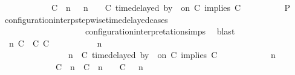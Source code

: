 \begin{isabellebody}
\ \ \ \ \ \ \ \ \ \ \ \ {\isacharparenleft}{\isacharparenleft}{\isacharparenleft}C\ {\isasymnot}{\isasymUp}\ n{\isacharparenright}\ {\isacharhash}\ {\isasymGamma}{\isacharparenright}{\isacharcomma}\ n\ {\isasymturnstile}\ {\isasymPsi}\ {\isasymtriangleright}\ {\isacharparenleft}{\isacharparenleft}C\ time{\isacharminus}delayed\ by\ {\isasymdelta}{\isasymtau}\ on\ C\ implies\ C\ {\isacharhash}\ {\isasymPhi}{\isacharparenright}{\isacharparenright}{\isacartoucheclose}\isanewline
\ \ \ \ \ \ \isamarkupfalse%
\ {\isacharquery}P\ \isamarkupfalse%
\ configuration{\isacharunderscore}interp{\isacharunderscore}stepwise{\isacharunderscore}timedelayed{\isacharunderscore}cases\isanewline
\ \ \ \ \ \ \ \ \ \ \ \ \ \ \ \ \ \ \ \ configuration{\isacharunderscore}interpretation{\isachardot}simps\ \isamarkupfalse%
\ blast\isanewline
\ \ \ \ \isamarkupfalse%
\isanewline
\ \ \ \ \ \ \isamarkupfalse%
\ {\isasymGamma}\ n\ C\ {\isasymdelta}{\isasymtau}\ C\ C\ {\isasymPsi}\ {\isasymPhi}\isanewline
\ \ \ \ \ \ \isamarkupfalse%
\ {\isacartoucheopen}{\isacharparenleft}{\isasymGamma}\ n\ {\isasymturnstile}\ {\isasymPsi}\ {\isasymtriangleright}\ {\isasymPhi}\ {\isacharequal}\isanewline
\ \ \ \ \ \ \ \ \ \ \ \ \ \ \ {\isacharparenleft}{\isasymGamma}{\isacharcomma}\ n\ {\isasymturnstile}\ {\isacharparenleft}{\isacharparenleft}C\ time{\isacharminus}delayed\ by\ {\isasymdelta}{\isasymtau}\ on\ C\ implies\ C\ {\isacharhash}\ {\isasymPsi}{\isacharparenright}\ {\isasymtriangleright}\ {\isasymPhi}{\isacharparenright}{\isacartoucheclose}\isanewline
\ \ \ \ \ \ \ {\isacartoucheopen}{\isacharparenleft}{\isasymGamma}\ n\ {\isasymturnstile}\ {\isasymPsi}\ {\isasymtriangleright}\ {\isasymPhi}\isanewline
\ \ \ \ \ \ \ \ \ \ \ \ {\isacharequal}\ {\isacharparenleft}{\isacharparenleft}{\isacharparenleft}C\ {\isasymUp}\ n{\isacharparenright}\ {\isacharhash}\ {\isacharparenleft}C\ {\isacharat}\ n\ {\isasymoplus}\ {\isasymdelta}{\isasymtau}\ {\isasymRightarrow}\ C\ {\isacharhash}\ {\isasymGamma}{\isacharparenright}{\isacharcomma}\ n\isanewline

\end{isabellebody}
